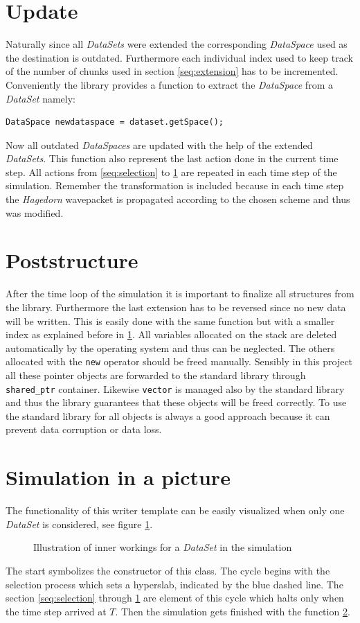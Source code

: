 \section{Update}
\label{seq:update}
Naturally since all \textit{DataSets} were extended the corresponding \textit{DataSpace} used as the destination is outdated. Furthermore each individual index used to keep track of the number of chunks used in section \ref{seq:extension} has to be incremented. Conveniently the library provides a function to extract the \textit{DataSpace} from a \textit{DataSet} namely:
\begin{lstlisting}
DataSpace newdataspace = dataset.getSpace();
\end{lstlisting}
Now all outdated \textit{DataSpaces} are updated with the help of the extended \textit{DataSets}. This function also represent the last action done in the current time step. All actions from \ref{seq:selection} to \ref{seq:update} are repeated in each time step of the simulation. Remember the transformation is included because in each time step the \textit{Hagedorn} wavepacket is propagated according to the chosen scheme and thus was modified.

\section{Poststructure}
\label{seq:poststructure}
After the time loop of the simulation it is important to finalize all structures from the library. Furthermore the last extension has to be reversed since no new data will be written. This is easily done with the same function but with a smaller index as explained before in \ref{seq:update}. All variables allocated on the stack are deleted automatically by the operating system and thus can be neglected. The others allocated with the \texttt{new} operator should be freed manually. Sensibly in this project all these pointer objects are forwarded to the standard library through \texttt{shared\_ptr} container. Likewise \texttt{vector} is managed also by the standard library and thus the library guarantees that these objects will be freed correctly. To use the standard library for all objects is always a good approach because it can prevent data corruption or data loss.

\section{Simulation in a picture}
The functionality of this writer template can be easily visualized when only one \textit{DataSet} is considered, see figure \ref{fig:illustration}.
\begin{figure}[ht!]
\caption{Illustration of inner workings for a \textit{DataSet} in the simulation}
\label{fig:illustration}
\end{figure}
The start symbolizes the constructor of this class. The cycle begins with the selection process which sets a hyperslab, indicated by the blue dashed line. The section \ref{seq:selection} through \ref{seq:update} are element of this cycle which halts only when the time step arrived at $T$. Then the simulation gets finished with the function \ref{seq:poststructure}.

